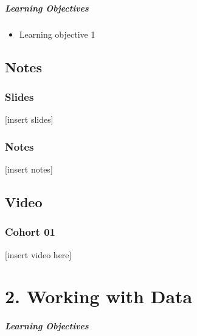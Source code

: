 \documentclass[
  letterpaper,
  DIV=11,
  numbers=noendperiod]{scrreprt}
\providecommand{\tightlist}{%
  \setlength{\itemsep}{0pt}\setlength{\parskip}{0pt}}
\begin{document}
\hypertarget{learning-objectives}{%
\subsubsection*{Learning Objectives}\label{learning-objectives}}

\begin{itemize}
\tightlist
\item
  Learning objective 1
\end{itemize}

\hypertarget{notes}{%
\chapter*{Notes}\label{notes}}

\hypertarget{slides}{%
\section*{Slides}\label{slides}}

{[}insert slides{]}

\hypertarget{notes-1}{%
\section*{Notes}\label{notes-1}}

{[}insert notes{]}

\hypertarget{video}{%
\chapter*{Video}\label{video}}

\hypertarget{cohort-01}{%
\section*{Cohort 01}\label{cohort-01}}

{[}insert video here{]}

\part{2. Working with Data}

\hypertarget{learning-objectives-1}{%
\subsubsection*{Learning Objectives}\label{learning-objectives-1}}
\end{document}
